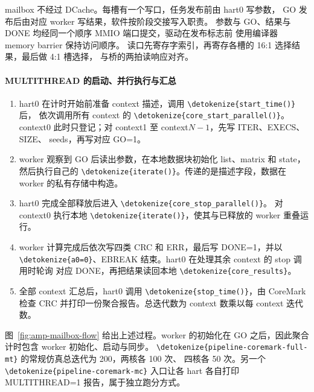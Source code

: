 \documentclass[UTF8,a4paper,12pt,fontset=none,scheme=plain]{ctexart}
\newcommand{\code}[1]{\texttt{\detokenize{#1}}}
\renewcommand{\code}[1]{{\small\ttfamily\urlstyle{tt}\expandafter\nolinkurl\expandafter{\detokenize{#1}}}}
\begin{document}
mailbox 不经过 DCache。每槽有一个写口，任务发布前由 hart0 写参数，
GO 发布后由对应 worker 写结果，软件按阶段交接写入职责。
参数与 GO、结果与 DONE 均经同一个顺序 MMIO 端口提交，驱动在发布标志前
使用编译器 memory barrier 保持访问顺序。
读口先寄存字索引，再寄存各槽的 16:1 选择结果，最后做 4:1 槽选择，
与桥的两拍读响应对齐。

\paragraph{MULTITHREAD 的启动、并行执行与汇总}
\begin{enumerate}[label=\arabic*.]
\item hart0 在计时开始前准备 context 描述，调用 \code{start_time()} 后，
依次调用所有 context 的 \code{core_start_parallel()}。
context0 此时只登记；对 context1 至 context$N-1$，先写 ITER、EXECS、SIZE、
seeds，再写对应 GO=1。
\item worker 观察到 GO 后读出参数，在本地数据块初始化 list、matrix 和
state，然后执行自己的 \code{iterate()}。传递的是描述字段，数据在 worker
的私有存储中构造。
\item hart0 完成全部释放后进入 \code{core_stop_parallel()}。
对 context0 执行本地 \code{iterate()}，使其与已释放的 worker 重叠运行。
\item worker 计算完成后依次写四类 CRC 和 ERR，最后写 DONE=1，并以
\code{a0=0}、EBREAK 结束。hart0 在处理其余 context 的 stop 调用时轮询
对应 DONE，再把结果读回本地 \code{core_results}。
\item 全部 context 汇总后，hart0 调用 \code{stop_time()}，由 CoreMark
检查 CRC 并打印一份聚合报告。总迭代数为 context 数乘以每 context 迭代数。
\end{enumerate}

图~\ref{fig:amp-mailbox-flow} 给出上述过程。worker 的初始化在 GO 之后，因此聚合计时包含 worker 初始化、启动与同步。
\code{pipeline-coremark-full-mt} 的常规仿真总迭代为 200，两核各 100 次、
四核各 50 次。另一个 \code{pipeline-coremark-mc} 入口让各 hart 各自打印
MULTITHREAD=1 报告，属于独立跑分方式。
\end{document}
